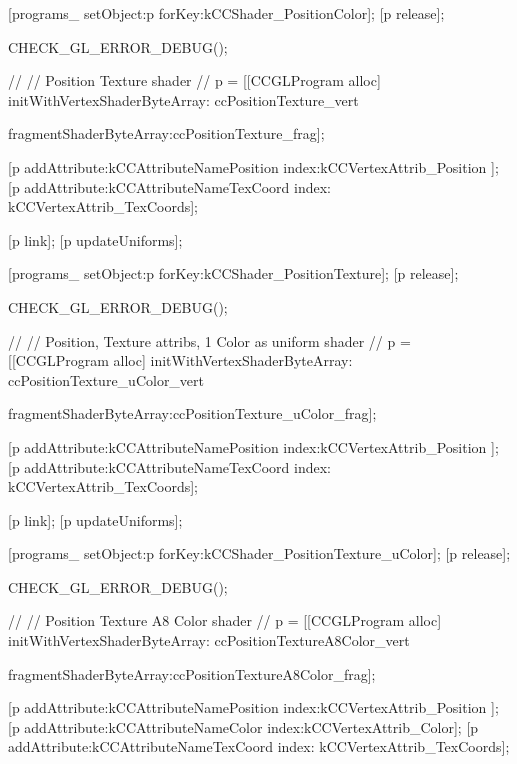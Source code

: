 \begin{DoxyCode}
{        [programs_ setObject:p forKey:kCCShader_PositionColor];
        [p release];

        CHECK_GL_ERROR_DEBUG();

        //
        // Position Texture shader
        //
        p = [[CCGLProgram alloc] initWithVertexShaderByteArray:
      ccPositionTexture_vert
                                                                   
      fragmentShaderByteArray:ccPositionTexture_frag];

        [p addAttribute:kCCAttributeNamePosition index:kCCVertexAttrib_Position
      ];
        [p addAttribute:kCCAttributeNameTexCoord index:
      kCCVertexAttrib_TexCoords];

        [p link];
        [p updateUniforms];

        [programs_ setObject:p forKey:kCCShader_PositionTexture];
        [p release];

        CHECK_GL_ERROR_DEBUG();

        //
        // Position, Texture attribs, 1 Color as uniform shader
        //
        p = [[CCGLProgram alloc] initWithVertexShaderByteArray:
      ccPositionTexture_uColor_vert
                                                                   
      fragmentShaderByteArray:ccPositionTexture_uColor_frag];

        [p addAttribute:kCCAttributeNamePosition index:kCCVertexAttrib_Position
      ];
        [p addAttribute:kCCAttributeNameTexCoord index:
      kCCVertexAttrib_TexCoords];

        [p link];
        [p updateUniforms];

        [programs_ setObject:p forKey:kCCShader_PositionTexture_uColor];
        [p release];
        
        CHECK_GL_ERROR_DEBUG();

        //
        // Position Texture A8 Color shader
        //
        p = [[CCGLProgram alloc] initWithVertexShaderByteArray:
      ccPositionTextureA8Color_vert
                                                                   
      fragmentShaderByteArray:ccPositionTextureA8Color_frag];

        [p addAttribute:kCCAttributeNamePosition index:kCCVertexAttrib_Position
      ];
        [p addAttribute:kCCAttributeNameColor index:kCCVertexAttrib_Color];
        [p addAttribute:kCCAttributeNameTexCoord index:
      kCCVertexAttrib_TexCoords];

}
\end{DoxyCode}

